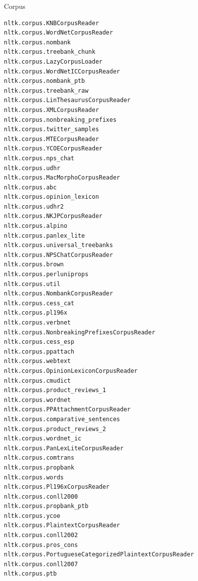 \documentclass[11pt]{beamer}
\begin{document}
\begin{frame}[fragile]{Corpus}
\begin{itemize}
{\begin{verbatim}
nltk.corpus.KNBCorpusReader                             nltk.corpus.WordNetCorpusReader                         nltk.corpus.nombank                                     nltk.corpus.treebank_chunk
nltk.corpus.LazyCorpusLoader                            nltk.corpus.WordNetICCorpusReader                       nltk.corpus.nombank_ptb                                 nltk.corpus.treebank_raw
nltk.corpus.LinThesaurusCorpusReader                    nltk.corpus.XMLCorpusReader                             nltk.corpus.nonbreaking_prefixes                        nltk.corpus.twitter_samples
nltk.corpus.MTECorpusReader                             nltk.corpus.YCOECorpusReader                            nltk.corpus.nps_chat                                    nltk.corpus.udhr
nltk.corpus.MacMorphoCorpusReader                       nltk.corpus.abc                                         nltk.corpus.opinion_lexicon                             nltk.corpus.udhr2
nltk.corpus.NKJPCorpusReader                            nltk.corpus.alpino                                      nltk.corpus.panlex_lite                                 nltk.corpus.universal_treebanks
nltk.corpus.NPSChatCorpusReader                         nltk.corpus.brown                                       nltk.corpus.perluniprops                                nltk.corpus.util
nltk.corpus.NombankCorpusReader                         nltk.corpus.cess_cat                                    nltk.corpus.pl196x                                      nltk.corpus.verbnet
nltk.corpus.NonbreakingPrefixesCorpusReader             nltk.corpus.cess_esp                                    nltk.corpus.ppattach                                    nltk.corpus.webtext
nltk.corpus.OpinionLexiconCorpusReader                  nltk.corpus.cmudict                                     nltk.corpus.product_reviews_1                           nltk.corpus.wordnet
nltk.corpus.PPAttachmentCorpusReader                    nltk.corpus.comparative_sentences                       nltk.corpus.product_reviews_2                           nltk.corpus.wordnet_ic
nltk.corpus.PanLexLiteCorpusReader                      nltk.corpus.comtrans                                    nltk.corpus.propbank                                    nltk.corpus.words
nltk.corpus.Pl196xCorpusReader                          nltk.corpus.conll2000                                   nltk.corpus.propbank_ptb                                nltk.corpus.ycoe
nltk.corpus.PlaintextCorpusReader                       nltk.corpus.conll2002                                   nltk.corpus.pros_cons                                   
nltk.corpus.PortugueseCategorizedPlaintextCorpusReader  nltk.corpus.conll2007                                   nltk.corpus.ptb         
   \end{verbatim}
  }
 \end{itemize}
\end{frame}
\end{document}
